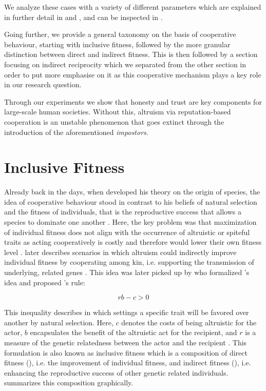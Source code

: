 \documentclass[sigconf]{acmart}
\newcommand{\impostors}{\textit{impostors}\xspace}
\begin{document}
    We analyze these cases with a variety of different parameters which are explained in further detail in  and , and can be inspected in .


    Going further, we provide a general taxonomy on the basis of cooperative behaviour, starting with inclusive fitness, followed by the more granular distinction between direct and indirect fitness.
    This is then followed by a section focusing on indirect reciprocity which we separated from the other section in order to put more emphasise on it as this cooperative mechanism plays a key role in our research question.

    Through our experiments we show that honesty and trust are key components for large-scale human societies.
    Without this, altruism via reputation-based cooperation is an unstable phenomenon that goes extinct through the introduction of the aforementioned \impostors.


    \section{Inclusive Fitness}\label{sec:inclusive-fitness}

    Already back in the days, when \citeauthor{darwin_origin_1859} \cite{darwin_origin_1859} developed his theory on the origin of species, the idea of cooperative behaviour stood in contrast to his beliefs of natural selection and the fitness of individuals, that is the reproductive success that allows a species to dominate one another \cite{pennisi_how_2005}.
    Here, the key problem was that maximization of individual fitness does not align with the occurrence of altruistic or spiteful traits as acting cooperatively is costly and therefore would lower their own fitness level \cite{west_altruism_2010}.
    \citeauthor{darwin_origin_1859} later describes scenarios in which altruism could indirectly improve individual fitness by cooperating among kin, i.e. supporting the transmission of underlying, related genes \cite{pennisi_how_2005,gardner_theory_2009}.
    This idea was later picked up by \citeauthor{hamilton_kin_1964} \cite{hamilton_kin_1964} who formalized \citeauthor{darwin_origin_1859}'s idea and proposed \citeauthor{hamilton_kin_1964}'s rule:

    \begin{equation}
        rb-c>0\label{eq:rb-c}
    \end{equation}


    This inequality describes in which settings a specific trait will be favored over another by natural selection.
    Here, $c$ denotes the costs of being altruistic for the actor, $b$ encapsulates the benefit of the altruistic act for the recipient, and $r$ is a measure of the genetic relatedness between the actor and the recipient \cite{west_altruism_2010}.
    This formulation is also known as inclusive fitness which is a composition of direct fitness (), i.e. the improvement of individual fitness, and indirect fitness (), i.e. enhancing the reproductive success of other genetic related individuals.
     summarizes this composition graphically.
\end{document}
